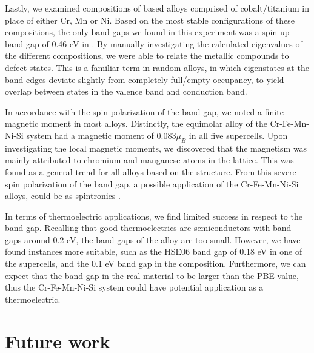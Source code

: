 \documentclass[UKenglish]{ifimaster}  %
\begin{document}
Lastly, we examined compositions of  based alloys comprised of cobalt/titanium in place of either Cr, Mn or Ni. Based on the most stable configurations of these compositions, the only band gaps we found in this experiment was a spin up band gap of 0.46 eV in . By manually investigating the calculated eigenvalues of the different compositions, we were able to relate the metallic compounds to defect states. This is a familiar term in random alloys, in which eigenstates at the band edges deviate slightly from completely full/empty occupancy, to yield overlap between states in the valence band and conduction band.

In accordance with the spin polarization of the band gap, we noted a finite magnetic moment in most alloys.  Distinctly, the equimolar alloy of the Cr-Fe-Mn-Ni-Si system had a magnetic moment of $0.083 \mu_B$ in all five supercells. Upon investigating the local magnetic moments, we discovered that the magnetism was mainly attributed to chromium and manganese atoms in the lattice. This was found as a general trend for all alloys based on the  structure. From this severe spin polarization of the band gap, a possible application of the Cr-Fe-Mn-Ni-Si alloys, could be as spintronics \cite{spintronic}. 

In terms of thermoelectric applications, we find limited success in respect to the band gap. Recalling that good thermoelectrics are semiconductors with band gaps around 0.2 eV, the band gaps of the  alloy are too small. However, we have found instances more suitable, such as the HSE06 band gap of 0.18 eV in one of the supercells, and the 0.1 eV band gap in the  composition. Furthermore, we can expect that the band gap in the real material to be larger than the PBE value, thus the Cr-Fe-Mn-Ni-Si system could have potential application as a thermoelectric.

\chapter{Future work}
\end{document}
